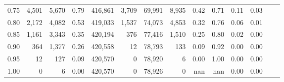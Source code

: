 \begin{tabular}{rrrrrrrrrrrrrr}
0.75 &   4,501 &   5,670 &    0.79 &  416,861 &    3,709 &  69,991 &   8,935 &  0.42 &  0.71 &  0.11 &      0.03 \\
0.80 &   2,172 &   4,082 &    0.53 &  419,033 &    1,537 &  74,073 &   4,853 &  0.32 &  0.76 &  0.06 &      0.01 \\
0.85 &   1,161 &   3,343 &    0.35 &  420,194 &      376 &  77,416 &   1,510 &  0.25 &  0.80 &  0.02 &      0.00 \\
0.90 &     364 &   1,377 &    0.26 &  420,558 &       12 &  78,793 &     133 &  0.09 &  0.92 &  0.00 &      0.00 \\
0.95 &      12 &     127 &    0.09 &  420,570 &        0 &  78,920 &       6 &  0.00 &  1.00 &  0.00 &      0.00 \\
1.00 &       0 &       6 &    0.00 &  420,570 &        0 &  78,926 &       0 &   nan &   nan &  0.00 &      0.00 \\
\bottomrule
\end{tabular}

